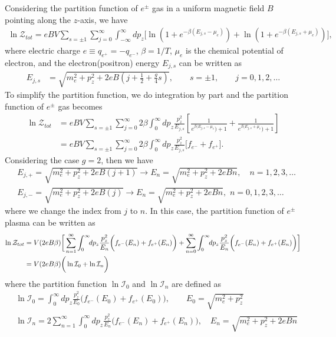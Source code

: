 \documentclass[sn-mathphys,Numbered]{sn-jnl}
\begin{document}
Considering the partition function of $e^\pm$ gas in a uniform magnetic field $B$ pointing along the $z$-axis, we have
\begin{align}
\ln\mathcal{Z}_{tot}=eBV\!\!\sum_{s=\pm1}\sum_{j=0}^\infty\int^\infty_{-\infty} \!\!dp_z\bigg[\ln\left(1+e^{-\beta(E_{j,s}-\mu_e)}\right)+\ln\left(1+e^{-\beta(E_{j,s}+\mu_e)}\right)\bigg],
\end{align}
where electric charge $e\equiv q_{e^{+}}=-q_{e^{-}}$, $\beta=1/T$, $\mu_e$ is the chemical potential of electron, and the electron(positron) energy $E_{j,s}$ can be written as
\begin{align}
E_{j,s}&=\sqrt{m^2_e+p^2_z+2eB\left(j+\frac{1}{2}+\frac{g}{4}s\right)},\qquad s=\pm1,\qquad j=0,1,2,\dots
\end{align}
To simplify the partition function, we do integration by part and the partition function of $e^\pm$ gas becomes
\begin{align}
\ln\mathcal{Z}_{tot}&=eBV\sum_{s=\pm1}\sum_{j=0}^\infty2\beta\int_0^\infty\!\!dp_z \frac{p_z^2}{E_{j,s}}\left[\frac{1}{e^{\beta(E_{j,s}-\mu_e})+1}+\frac{1}{e^{\beta(E_{j,s}+\mu_e})+1}\right]\\
&=eBV\sum_{s=\pm1}\sum_{j=0}^\infty2\beta\int_0^\infty\!\!dp_z \frac{p_z^2}{E_{j,s}}\bigg[f_{e^-}+f_{e^+}\bigg].
\end{align}
Considering the case $g=2$, then we have
\begin{align}
&E_{j,+}=\sqrt{{m}_e^2+p^2_z+2eB\left(j+1\right)}\longrightarrow E_{n}=\sqrt{{m}_e^2+p^2_z+2eBn},\quad n=1,2,3,\dots\\
&E_{j,-}=\sqrt{{m}_e^2+p^2_z+2eB\left(j\right)}\longrightarrow E_{n}=\sqrt{{m}_e^2+p^2_z+2eBn},\,\, n=0,1,2,3,\dots
\end{align}
where we change the index from $j$ to $n$. In this case, the partition function of $e^\pm$ plasma can be written as
\begin{align}
\ln\mathcal{Z}_{tot}&=V(2eB\beta) \bigg[ \sum_{n=1}^\infty\int_0^\infty\!\!dp_z \frac{p_z^2}{E_{n}}\bigg(f_{e^-}(E_n)+f_{e^+}(E_n)\bigg)+\sum_{n=0}^\infty\int_0^\infty\!\!dp_z \frac{p_z^2}{E_{n}}\bigg(f_{e^-}(E_n)+f_{e^+}(E_n)\bigg)\bigg]\notag\\
&=V(2eB\beta)\bigg(\ln\mathcal{I}_{0}+\ln\mathcal{I}_{n}\bigg)
\end{align}
where the partition function $\ln\mathcal{I}_{0}$ and $\ln\mathcal{I}_{n}$ are defined as
\begin{align}
&\ln\mathcal{I}_{0}=\int_0^\infty\!\!dp_z \frac{p_z^2}{E_0}\bigg(f_{e^-}(E_0)+f_{e^+}(E_0)\bigg),\qquad E_0=\sqrt{{m}_e^2+p^2_z} \\
&\ln\mathcal{I}_{n}=2 \sum_{n=1}^\infty\int_0^\infty\!\!dp_z \frac{p_z^2}{E_{n}}\bigg(f_{e^-}(E_n)+f_{e^+}(E_n)\bigg),\quad E_n=\sqrt{{m}_e^2+p^2_z+2eBn}
\end{align}
\end{document}
